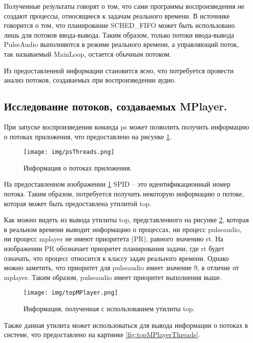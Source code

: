 Полученные результаты говорят о том, что сами программы воспроизведения не создают процессы, относящиеся к задачам реального времени. В источнике \cite{hackerNews} говорится о том, что планирование SCHED\_FIFO может быть использовано лишь для потоков ввода-вывода. Таким образом, только потоки ввода-вывода PulseAudio выполняются в режиме реального времени, а управляющий поток, так называемый MainLoop, остается обычным потоком.

Из предоставленной информации становится ясно, что потребуется провести анализ потоков, создаваемых при воспроизведении аудио.

\subsection{Исследование потоков, создаваемых MPlayer. }
При запуске воспроизведения команда ps может позволить получить информацию о потоках приложения, что предоставлено на рисунке \ref{fig:psThreads}.

\begin{figure}[H]
	\centering
	\texttt{[image: img/psThreads.png]}
	\caption{Информация о потоках приложения. }
	\label{fig:psThreads}
\end{figure}

На предоставленном изображении \ref{fig:psThreads} SPID -- это идентификационный номер потока. Таким образом, потребуется получить некоторую информацию о потоке, которая может быть предоставлена утилитой top.

Как можно видеть из вывода утилиты top, представленного на рисунке \ref{fig:topMPlayer}, которая в реальном времени выводит информацию о процессах, ни процесс pulseaudio, ни процесс mplayer не имеют приоритета (PR), равного значению rt. На изображении PR обозначает приоритет планирования задачи, где rt будет означать, что процесс относится к классу задач реального времени. Однако можно заметить, что приоритет для pulseaudio имеет значение 9, в отличие от mplayer. Таким образом, pulseaudio имеет приоритет выполнения выше.

\begin{figure}[H]
	\centering
	\texttt{[image: img/topMPlayer.png]}
	\caption{Информация, полученная с использованием утилиты top. }
	\label{fig:topMPlayer}
\end{figure}

Также данная утилита может использоваться для вывода информации о потоках в системе, что предоставлено на картинке \ref{fig:topMPlayerThreads}.

